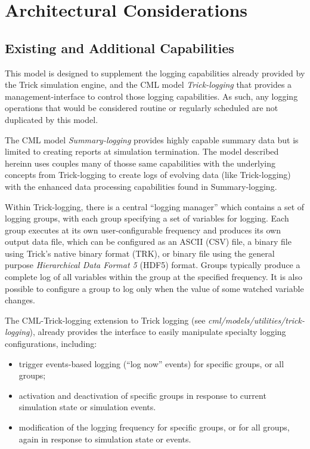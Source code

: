 \documentclass[11pt,fleqn]{report}
\begin{document}
\section {Architectural Considerations}

\subsection {Existing and Additional Capabilities}
This model is designed to supplement the logging capabilities already
provided by the Trick simulation engine, and the CML model
\textit{Trick-logging} that provides a management-interface to control those
logging capabilities. As such, any logging operations that would be
considered routine or regularly scheduled are not duplicated by this model.

The CML model \textit{Summary-logging} provides highly capable summary data
but is limited to creating reports at simulation termination. The model
described hereinn uses couples many of thosse same capabilities with the
underlying concepts from Trick-logging to create logs of evolving data (like
Trick-logging) with the enhanced data processing capabilities found in
Summary-logging.

Within Trick-logging, there is a central “logging manager” which contains a
set of logging groups, with each group specifying a set of variables for
logging.
Each group executes at its own user-configurable frequency and produces its own
output data file, which can be configured as an ASCII (CSV) file, a binary file
using Trick’s native binary format (TRK), or binary file using the general
purpose \textit{Hierarchical Data Format 5} (HDF5) format.
Groups typically produce a complete log of all variables within
the group at the specified frequency. It is also possible to configure a group
to log only when the value of some watched variable changes.

The CML-Trick-logging extension to Trick logging (see
\textit{cml/models/utilities/trick-logging}),
already provides the interface to easily manipulate specialty logging
configurations, including:

\begin{itemize}
  \item trigger events-based logging (“log now” events) for specific groups,
        or all groups;
  \item activation and deactivation of specific groups in response to current
        simulation state or simulation events.
  \item modification of the logging frequency for specific groups, or for all
        groups, again in response to simulation state or events.
\end{itemize}
\end{document}
